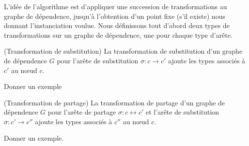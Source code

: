 L'idée de l'algorithme est d'appliquer une succession de transformations
au graphe de dépendence, jusqu'à l'obtention d'un point fixe (s'il
existe) nous donnant l'instanciation voulue. Nous définissons tout
d'abord deux types de transformations sur un graphe de dépendence, une
pour chaque type d'arête.

\begin{mydef} (Transformation de substitution) La transformation de
  substitution d'un graphe de dépendence $G$ pour l'arête de
  substitution $\sigma : c \to c'$ ajoute les types associés à $c'$ au
  nœud $c$.
\end{mydef}

\todo Donner un exemple

\iffalse
\noindent \textit{New dependency graph using the right substitution link as a substitution transformation.}

\begin{center}
\begin{tikzpicture}[node distance = 3cm, auto]
  \node [cloud, fill=white,node distance = 3cm] (c11) {C: a};
  \node [cloud, fill=white, right of=c11,node distance = 3cm] (c12) {D: a};
  \node [cloud, fill=white, right of=c12,node distance = 3cm] (c13) {D: num};
  \node [cloud, fill=white, below of=c11,node distance = 1.5cm] (c21) {C: b};
  \node [cloud, fill=white, below of=c12,node distance = 3cm] (c32) {D: num};
  \draw[-to,blue,ultra thick](c11) -- (c21);
  \draw [-to,blue,ultra thick] (c21) -- (c11);
  \draw [-to,blue,ultra thick] (c12) -- (c32);
  \draw [-to,blue,ultra thick] (c13) -- (c32);
  \draw [green,ultra thick] (c11) -- (c12);
\end{tikzpicture}
\end{center}
\fi

\begin{mydef} (Transformation de partage) La transformation de
  partage d'un graphe de dépendence $G$ pour l'arête de
  partage $\sigma : c \leftrightarrow c'$ et l'arête de substitution
  $\sigma : c' \to c''$ ajoute les types associés à $c''$ au
  nœud $c$.
\end{mydef}

\todo Donner un exemple.

\iffalse
\begin{center}
\begin{tikzpicture}[node distance = 3cm, auto]
  \node [cloud, fill=white,node distance = 3cm] (c11) {C: a};
  \node [cloud, fill=white, right of=c11,node distance = 3cm] (c12) {D: a};
  \node [cloud, fill=white, right of=c12,node distance = 3cm] (c13) {C: num};
  \node [cloud, fill=white, below of=c11,node distance = 1.5cm] (c21) {C: b};
  \node [cloud, fill=white, below of=c12,node distance = 3cm] (c32) {D: num};
  \draw[-to,blue,ultra thick](c11) -- (c21);
  \draw [-to,blue,ultra thick] (c21) -- (c11);
  \draw [-to,blue,ultra thick] (c12) -- (c32);
  \draw [green,ultra thick] (c11) -- (c12);
\end{tikzpicture}
\end{center}
\fi

